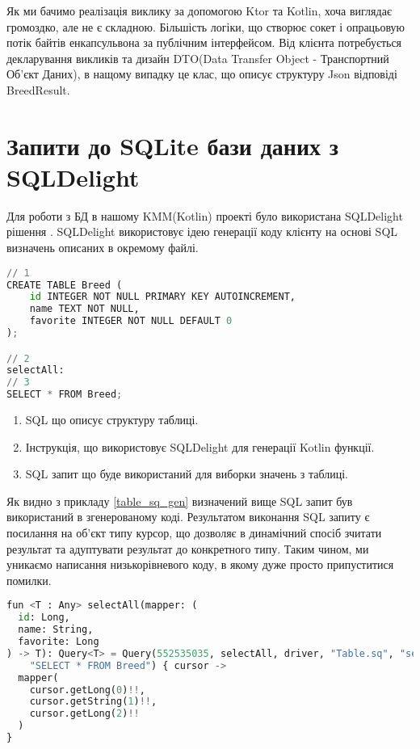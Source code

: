 Як ми бачимо реалізація виклику за допомогою Ktor та Kotlin, хоча виглядає громоздко, але не є складною.
Більшість логіки, що створює сокет і опрацьовую потік байтів енкапсульвона за публічним інтерфейсом.
Від клієнта потребується декларування викликів та дизайн DTO(Data Transfer Object - Транспортний Об'єкт Даних),
в нащому випадку це клас, що описує структуру Json відповіді BreedResult.


\section{Запити до SQLite бази даних з SQLDelight}
\label{section.4.3}
Для роботи з БД в нашому KMM(Kotlin) проекті було використана SQLDelight рішення \cite{sqldelight_home}.
SQLDelight використовує ідею генерації коду клієнту на основі SQL визначень описаних в окремому файлі.

\begin{lstlisting}[style=light, language=Python,label={lst:table_sq},caption=Table.sq]
// 1
CREATE TABLE Breed (
    id INTEGER NOT NULL PRIMARY KEY AUTOINCREMENT,
    name TEXT NOT NULL,
    favorite INTEGER NOT NULL DEFAULT 0
);

// 2
selectAll:
// 3
SELECT * FROM Breed;
\end{lstlisting}

\begin{enumerate}
    \item SQL що описує структуру таблиці.
    \item Інструкція, що використовує SQLDelight для генерації Kotlin функції.
    \item SQL запит що буде використаний для виборки значень з таблиці.
\end{enumerate}

Як видно з прикладу \ref{table_sq_gen} визначений вище SQL запит був використаний в згенерованому коді.
Результатом виконання SQL запиту є посилання на об'єкт типу курсор, що дозволяє в динамічний спосіб зчитати
результат та адуптувати результат до конкретного типу.
Таким чином, ми уникаємо написання низькорівневого коду, в якому дуже просто припуститися помилки.

\begin{lstlisting}[style=light, language=Python,label={lst:table_sq_gen},caption=Generate code]
fun <T : Any> selectAll(mapper: (
  id: Long,
  name: String,
  favorite: Long
) -> T): Query<T> = Query(552535035, selectAll, driver, "Table.sq", "selectAll",
    "SELECT * FROM Breed") { cursor ->
  mapper(
    cursor.getLong(0)!!,
    cursor.getString(1)!!,
    cursor.getLong(2)!!
  )
}
\end{lstlisting}


